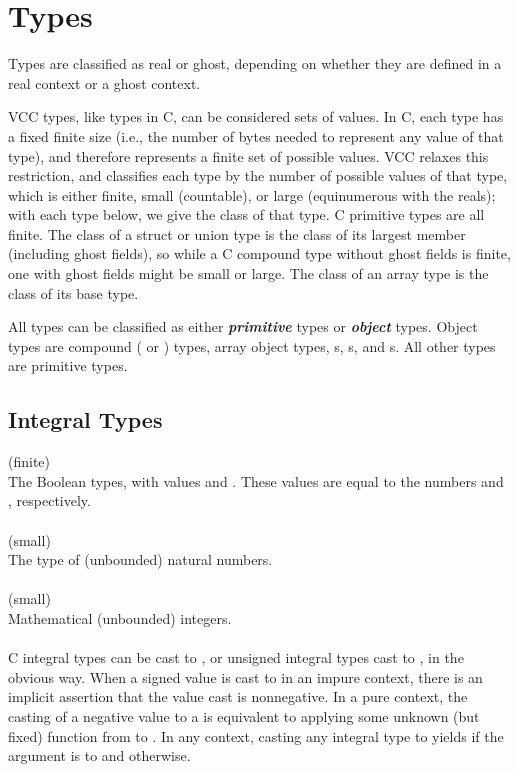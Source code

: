 \documentclass[preprint,nocopyrightspace]{sigplanconf}
\newcommand{\Def}[1]{\textit{\textbf{#1}}}
\begin{document}
{{\section{Types}
\label{sec:types}
Types are classified as real or ghost, depending on whether they are
defined in a real context or a ghost context.  

VCC types, like types in C, can be considered sets of values. In C,
each type has a fixed finite size (i.e., the number of bytes needed to
represent any value of that type), and therefore represents a finite
set of possible values. VCC relaxes this restriction, and classifies
each type by the number of possible values of that type, which is
either finite, small (countable), or large (equinumerous with the
reals); with each type below, we give the class of that type. C
primitive types are all finite. The class of a struct or union type is
the class of its largest member (including ghost fields), so while a C
compound type without ghost fields is finite, one with ghost fields
might be small or large. The class of an array type is the class of
its base type.

All types can be classified as either \Def{primitive} types
or \Def{object} types. Object types are compound (
or ) types, array object types, \vcc{\thread}s, 
\vcc{\claim}s, and \vcc{\blob}s. All other types are primitive types.

\subsection{Integral Types}

\vcc{\bool} (finite)\\
The Boolean types, with values \vcc{\true} and \vcc{\false}. These
values are equal to the \vcc{\natural} numbers  and , respectively.
\\\\
\vcc{\natural} (small)\\
The type of (unbounded) natural numbers. 
\\\\
\vcc{\integer} (small)\\
Mathematical (unbounded) integers. 
\\\\
C integral types can be cast to \vcc{\integer},
or unsigned integral types cast to \vcc{\natural}, in the obvious
way. When a signed value is cast to \vcc{\natural} in an impure
context, there is an implicit assertion that the value cast is
nonnegative. In a pure context, the casting of a negative value to 
a \vcc{\natural} is equivalent to applying some unknown (but fixed)
function from  to . In any context, casting
any integral type to \vcc{\bool} yields \vcc{\true} if the argument
is \vcc{==} to  and \vcc{\false} otherwise.

}}
\end{document}
